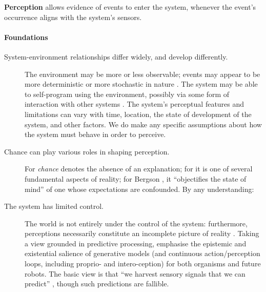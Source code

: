 \begin{defn}\label{def:perception}
\hypertarget{def:perception}{}\textbf{Perception} allows evidence of events to enter the system,
whenever the event's occurrence aligns with the system's sensors.
\end{defn}


\paragraph{\textbf{\upshape Foundations}}

\begin{description}
\item[System-environment relationships differ widely, and develop
  differently.]  The environment may be more or less observable;
  events may appear to be more deterministic or more stochastic in
  nature \cite[pp.~42--44]{russel2003artificial}. The system may be
  able to self-program using the environment, possibly via some form
  of interaction with other systems
  \cite[esp.~p.~234]{clark1998being}.  The system's perceptual
  features and limitations can vary with time, location, the state of
  development of the system, and other factors.  We do make any
  specific assumptions about how the system must behave in order to
  perceive.
\item[Chance can play various roles in shaping perception.] For
  \citet[p.~99]{hume1904enquiry} \emph{chance} denotes the absence of
  an explanation; for \citet{peirce1931necessity} it is one of several
  fundamental aspects of reality; for Bergson
  \cite[p.~234]{bergson1983creative}, it ``objectifies the state of
  mind'' of one whose expectations are confounded.  By any
  understanding:
\item[The system has limited control.] The world is not entirely under
  the control of the system:
  furthermore,
  perceptions necessarily constitute an incomplete picture of reality
  \cite{hoffman2015interface}.
Taking a view grounded in predictive processing, \citet[pp.~2, 17--18]{10.3389/frobt.2018.00021} emphasise 
the epistemic and existential salience of generative models
(and continuous action/perception loops, including proprio- and intero-ception)
for both organisms and future robots.  The basic view is
that 
``we harvest sensory signals that we can predict'' \cite{friston2009free},
though such predictions are fallible.  
\end{description}

